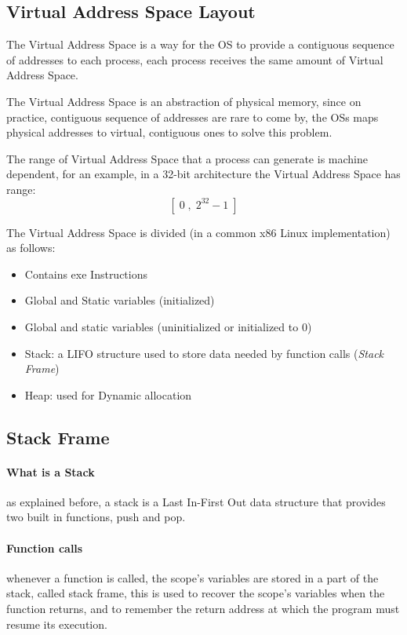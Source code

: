 \documentclass[openright, twoside]{report}
\theoremstyle{definition}
\theoremstyle{example}
\begin{document}
				\subsection{Virtual Address Space Layout}
				The Virtual Address Space is a way for the OS to provide a contiguous 
				sequence of addresses to each process, each process receives the same amount of Virtual Address Space.

				The Virtual Address Space is an abstraction of physical memory, 
				since on practice, contiguous sequence of addresses are rare to come by, 
				the OSs maps physical addresses to virtual, contiguous ones to solve this problem.

				The range of Virtual Address Space that a process can generate is machine 
				dependent, for an example, in a 32-bit architecture the Virtual Address Space has range:
				\[ [\;0 \;,\; 2^{32} - 1\;]\]

				The Virtual Address Space is divided (in a common x86 Linux implementation) 
				as follows:
				\begin{itemize}
					\item { Contains exe Instructions}
					\item { Global and Static variables (initialized)}
					\item { Global and static variables (uninitialized or initialized to 0)}
					\item { Stack: a LIFO structure used to store data needed by function calls (\emph{Stack Frame})}
					\item { Heap: used for Dynamic allocation}
				\end{itemize}

				\subsection{Stack Frame}
				\paragraph{What is a Stack} as explained before, a stack is a Last 
				In-First Out data structure that provides two built in functions, push and pop.

				\paragraph{Function calls} whenever a function is called, the scope's 
				variables are stored in a part of the stack, called stack frame, this is
				used to recover
				the scope's variables when the function returns, and to remember the 
				return address at which the program must resume its execution.
\end{document}
